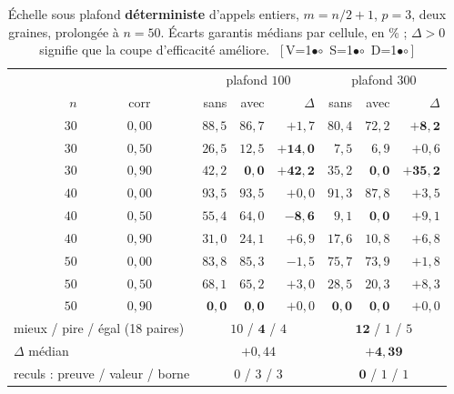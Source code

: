 \documentclass[11pt,a4paper]{article}
\theoremstyle{plain}
\theoremstyle{remark}
\newcommand{\cfgm}[1]{\ifnum#1=1$\bullet$\else$\circ$\fi}
\newcommand{\conf}[3]{%
  \textsf{\footnotesize[\,V\cfgm{#1}\ S\cfgm{#2}\ D\cfgm{#3}\,]}}
\begin{document}
\begin{table}[H]
\centering
\caption{Échelle sous plafond \textbf{déterministe} d'appels entiers,
$m=n/2+1$, $p=3$, deux graines, prolongée à $n=50$. Écarts garantis
médians par cellule, en \% ; $\Delta>0$ signifie que la coupe
d'efficacité améliore.\ \conf{1}{1}{1}}
\label{tab:echelledeterm}
\setlength{\tabcolsep}{5pt}\small
\begin{tabular}{rc|rrr|rrr}
\toprule
& & \multicolumn{3}{c|}{plafond $100$} & \multicolumn{3}{c}{plafond $300$}\\
$n$ & corr & sans & avec & $\Delta$ & sans & avec & $\Delta$\\
\midrule
$30$ & $0{,}00$ & $88{,}5$ & $86{,}7$ & $+1{,}7$ & $80{,}4$ & $72{,}2$ & $\mathbf{+8{,}2}$\\
$30$ & $0{,}50$ & $26{,}5$ & $12{,}5$ & $\mathbf{+14{,}0}$ & $7{,}5$ & $6{,}9$ & $+0{,}6$\\
$30$ & $0{,}90$ & $42{,}2$ & $\mathbf{0{,}0}$ & $\mathbf{+42{,}2}$ & $35{,}2$ & $\mathbf{0{,}0}$ & $\mathbf{+35{,}2}$\\
$40$ & $0{,}00$ & $93{,}5$ & $93{,}5$ & $+0{,}0$ & $91{,}3$ & $87{,}8$ & $+3{,}5$\\
$40$ & $0{,}50$ & $55{,}4$ & $64{,}0$ & $\mathbf{-8{,}6}$ & $9{,}1$ & $\mathbf{0{,}0}$ & $+9{,}1$\\
$40$ & $0{,}90$ & $31{,}0$ & $24{,}1$ & $+6{,}9$ & $17{,}6$ & $10{,}8$ & $+6{,}8$\\
$50$ & $0{,}00$ & $83{,}8$ & $85{,}3$ & $-1{,}5$ & $75{,}7$ & $73{,}9$ & $+1{,}8$\\
$50$ & $0{,}50$ & $68{,}1$ & $65{,}2$ & $+3{,}0$ & $28{,}5$ & $20{,}3$ & $+8{,}3$\\
$50$ & $0{,}90$ & $\mathbf{0{,}0}$ & $\mathbf{0{,}0}$ & $+0{,}0$ & $\mathbf{0{,}0}$ & $\mathbf{0{,}0}$ & $+0{,}0$\\
\midrule
\multicolumn{2}{l|}{mieux / pire / égal (18 paires)}
 & \multicolumn{3}{c|}{$10$ / $\mathbf{4}$ / $4$}
 & \multicolumn{3}{c}{$\mathbf{12}$ / $1$ / $5$}\\
\multicolumn{2}{l|}{$\Delta$ médian}
 & \multicolumn{3}{c|}{$+0{,}44$} & \multicolumn{3}{c}{$\mathbf{+4{,}39}$}\\
\multicolumn{2}{l|}{reculs : preuve / valeur / borne}
 & \multicolumn{3}{c|}{$0$ / $3$ / $3$}
 & \multicolumn{3}{c}{$\mathbf{0}$ / $1$ / $1$}\\
\bottomrule
\end{tabular}
\end{table}
\end{document}

